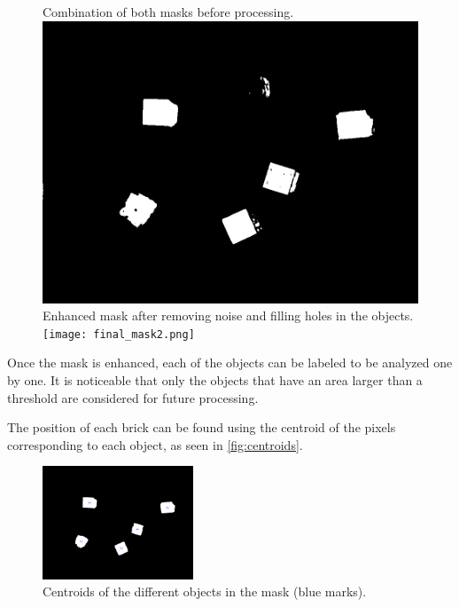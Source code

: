 \begin{figure}[H]
    \captionbox  %
    {
        Combination of both masks before processing.             
        \label{fig:final_mask}                                  
    }                                                                 
    {                                                                  
        \includegraphics[width=.4\textwidth]{figures/final_mask.png}         
    }                                                                    
    \hspace{5pt}                                                          
    \captionbox
    {       
        Enhanced mask after removing noise and filling holes in the objects.
        \label{fig:final_mask2}                                     
    }
    {
        \texttt{[image: final\_mask2.png]}            
    }                                                                             
\end{figure}

Once the mask is enhanced, each of the objects can be labeled to be analyzed one by one. It is noticeable that only the objects that have an area larger than a threshold are considered for future processing.

The position of each brick can be found using the centroid of the pixels corresponding to each object, as seen in \autoref{fig:centroids}.

\begin{figure}[H]
    \includegraphics[width=0.4\textwidth]{figures/centroids.png}
    \caption{Centroids of the different objects in the mask (blue marks).}
    \label{fig:centroids}
\end{figure}


